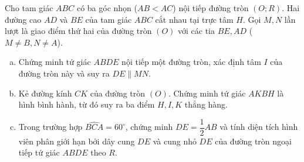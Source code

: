 \begin{bt}%
Cho tam giác $ABC$ có ba góc nhọn ($AB < AC$) nội tiếp đường tròn $(O; R)$. Hai đường cao $AD$ và $BE$ của tam giác $ABC$ cắt nhau tại trực tâm $H$. Gọi $M, N$ lần lượt là giao điểm thứ hai của đường tròn $(O)$ với các tia $BE, AD$ ($M \ne B, N \ne A$).
\begin{enumerate}[a)]
	\item Chứng minh tứ giác $ABDE$ nội tiếp một đường tròn, xác định tâm $I$ của đường tròn này và suy ra $DE \parallel MN$.
	\item Kẻ đường kính $CK$ của đường tròn $(O)$. Chứng minh tứ giác $AKBH$ là hình bình hành, từ đó suy ra ba điểm $H, I, K$ thẳng hàng.
	\item Trong trường hợp $\widehat{BCA} = 60^\circ$, chứng minh $DE = \dfrac{1}{2}AB$ và tính diện tích hình viên phân giới hạn bởi dây cung $DE$ và cung nhỏ $DE$ của đường tròn ngoại tiếp tứ giác $ABDE$ theo $R$.
\end{enumerate}
\end{bt}
